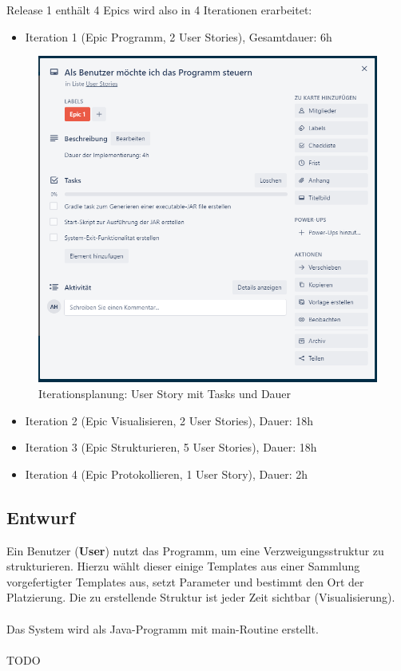 \documentclass[11pt]{article}
\begin{document}
    \newpage

    Release 1 enthält 4 Epics wird also in 4 Iterationen erarbeitet:
    \begin{itemize}
        \item Iteration 1 (Epic Programm, 2 User Stories), Gesamtdauer: 6h
    \end{itemize}
    \begin{figure}[H]
        \centering
        \includegraphics[width=12cm]{../images/User_Story_1.PNG}
        \caption{Iterationsplanung: User Story mit Tasks und Dauer}
    \end{figure}
    \begin{itemize}
        \item Iteration 2 (Epic Visualisieren, 2 User Stories), Dauer: 18h
        \item Iteration 3 (Epic Strukturieren, 5 User Stories), Dauer: 18h
        \item Iteration 4 (Epic Protokollieren, 1 User Story), Dauer: 2h
    \end{itemize}

    \newpage
    
    \subsection{Entwurf}
    Ein Benutzer (\textbf{User}) nutzt das Programm, um eine Verzweigungsstruktur zu strukturieren.
    Hierzu wählt dieser einige Templates aus einer Sammlung vorgefertigter Templates aus, setzt Parameter und
    bestimmt den Ort der Platzierung.
    Die zu erstellende Struktur ist jeder Zeit sichtbar (Visualisierung).\\~\\
    Das System wird als Java-Programm mit main-Routine erstellt.\\~\\
    TODO
\end{document}
